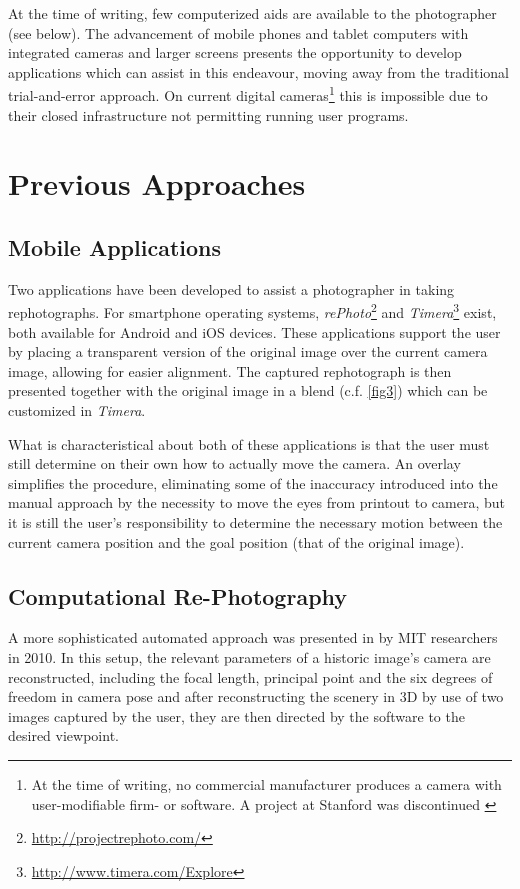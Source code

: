 At the time of writing, few computerized aids are available to the
photographer (see below).
The advancement of mobile phones and tablet computers with integrated cameras
and larger screens presents the opportunity to develop applications which can
assist in this endeavour, moving away from the traditional trial-and-error
approach.  On current digital cameras\footnote{At the time of writing, no
   commercial manufacturer produces a camera with user-modifiable firm- or
software. A project at Stanford \citep{Levoy2010} was discontinued
\cite{FrankenCam}} this is impossible due to their closed infrastructure not
permitting running user programs. 

\section{Previous Approaches}

\subsection{Mobile Applications}

Two applications have been developed to assist a photographer in taking
rephotographs. For smartphone operating systems,
\emph{rePhoto}\footnote{\url{http://projectrephoto.com/}} and
\emph{Timera}\footnote{\url{http://www.timera.com/Explore}} exist, both
available for Android and iOS devices. These applications support the user by placing a transparent
version of the original image over the current camera image, allowing for easier
alignment. The captured rephotograph is then presented together with the
original image in a blend (c.f. \autoref{fig3}) which can be customized in
\emph{Timera}.

What is characteristical about both of these applications is that the user must still
determine on their own how to actually move the camera. An overlay simplifies
the procedure, eliminating some of the inaccuracy introduced into the manual approach by the
necessity to move the eyes from printout to camera, but it is still the user's
responsibility to determine the necessary motion between the current camera
position and the goal position (that of the original image). 


\subsection{Computational Re-Photography}

A more
sophisticated automated approach was presented in \citep{bae2010} by MIT researchers in
2010. In this setup, the relevant parameters of a historic image's camera are
reconstructed, including the focal length, principal point and the six degrees
of freedom in camera pose and after reconstructing the scenery in 3D by use of
two images captured by the user, they are then directed by the software to the
desired viewpoint.

